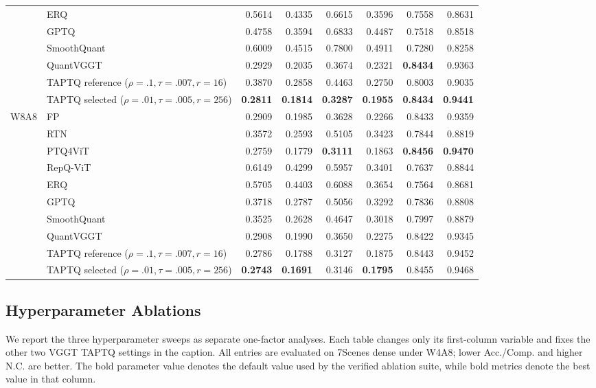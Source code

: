 \documentclass[journal]{Tail_Aware_Post_Training_Quantization_for_3D_Geometry_Models_TMM/IEEEtran}
\newcommand{\taptq}{\textsc{TAPTQ}}
\begin{document}
\begin{table}[t]
\begin{tabular}{clrrrrrr}
& ERQ & 0.5614 & 0.4335 & 0.6615 & 0.3596 & 0.7558 & 0.8631 \\
& GPTQ & 0.4758 & 0.3594 & 0.6833 & 0.4487 & 0.7518 & 0.8518 \\
& SmoothQuant & 0.6009 & 0.4515 & 0.7800 & 0.4911 & 0.7280 & 0.8258 \\
& QuantVGGT & 0.2929 & 0.2035 & 0.3674 & 0.2321 & \textbf{0.8434} & 0.9363 \\
\rowcolor{yellow!15}
& \taptq{} reference ($\rho=.1,\tau=.007,r=16$) & 0.3870 & 0.2858 & 0.4463 & 0.2750 & 0.8003 & 0.9035 \\
\rowcolor{yellow!15}
& \taptq{} selected ($\rho=.01,\tau=.005,r=256$) & \textbf{0.2811} & \textbf{0.1814} & \textbf{0.3287} & \textbf{0.1955} & \textbf{0.8434} & \textbf{0.9441} \\
\midrule
\multirow{10}{*}{W8A8}
& FP & 0.2909 & 0.1985 & 0.3628 & 0.2266 & 0.8433 & 0.9359 \\
& RTN & 0.3572 & 0.2593 & 0.5105 & 0.3423 & 0.7844 & 0.8819 \\
& PTQ4ViT & 0.2759 & 0.1779 & \textbf{0.3111} & 0.1863 & \textbf{0.8456} & \textbf{0.9470} \\
& RepQ-ViT & 0.6149 & 0.4299 & 0.5957 & 0.3401 & 0.7637 & 0.8844 \\
& ERQ & 0.5705 & 0.4403 & 0.6088 & 0.3654 & 0.7564 & 0.8681 \\
& GPTQ & 0.3718 & 0.2787 & 0.5056 & 0.3292 & 0.7836 & 0.8808 \\
& SmoothQuant & 0.3525 & 0.2628 & 0.4647 & 0.3018 & 0.7997 & 0.8879 \\
& QuantVGGT & 0.2908 & 0.1990 & 0.3650 & 0.2275 & 0.8422 & 0.9345 \\
\rowcolor{yellow!15}
& \taptq{} reference ($\rho=.1,\tau=.007,r=16$) & 0.2786 & 0.1788 & 0.3127 & 0.1875 & 0.8443 & 0.9452 \\
\rowcolor{yellow!15}
& \taptq{} selected ($\rho=.01,\tau=.005,r=256$) & \textbf{0.2743} & \textbf{0.1691} & 0.3146 & \textbf{0.1795} & 0.8455 & 0.9468 \\
\bottomrule
\end{tabular}
\end{table}

\subsection{Hyperparameter Ablations}
\label{app:hyper_ablation}

We report the three hyperparameter sweeps as separate one-factor analyses. Each table changes only its first-column variable and fixes the other two VGGT TAPTQ settings in the caption. All entries are evaluated on 7Scenes dense under W4A8; lower Acc./Comp. and higher N.C. are better. The bold parameter value denotes the default value used by the verified ablation suite, while bold metrics denote the best value in that column.
\end{document}
